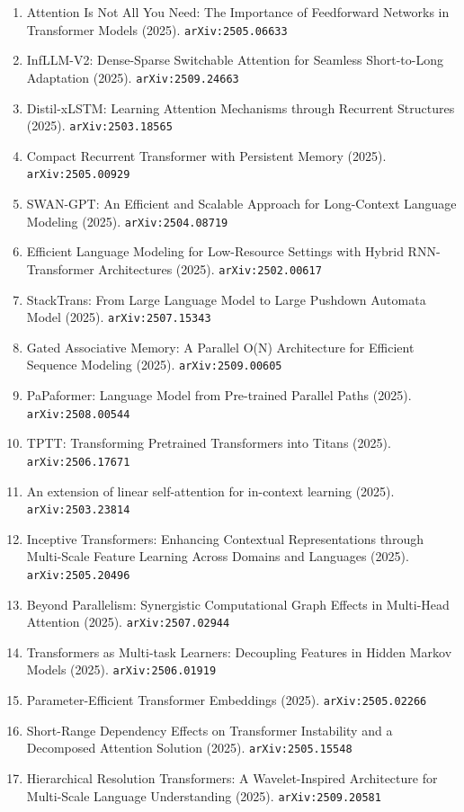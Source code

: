 \documentclass[11pt]{article}
\begin{document}
\begin{enumerate}
  \item Attention Is Not All You Need: The Importance of Feedforward Networks in Transformer Models (2025). \texttt{arXiv:2505.06633}
  \item InfLLM-V2: Dense-Sparse Switchable Attention for Seamless Short-to-Long Adaptation (2025). \texttt{arXiv:2509.24663}
  \item Distil-xLSTM: Learning Attention Mechanisms through Recurrent Structures (2025). \texttt{arXiv:2503.18565}
  \item Compact Recurrent Transformer with Persistent Memory (2025). \texttt{arXiv:2505.00929}
  \item SWAN-GPT: An Efficient and Scalable Approach for Long-Context Language
  Modeling (2025). \texttt{arXiv:2504.08719}
  \item Efficient Language Modeling for Low-Resource Settings with Hybrid
  RNN-Transformer Architectures (2025). \texttt{arXiv:2502.00617}
  \item StackTrans: From Large Language Model to Large Pushdown Automata Model (2025). \texttt{arXiv:2507.15343}
  \item Gated Associative Memory: A Parallel O(N) Architecture for Efficient Sequence Modeling (2025). \texttt{arXiv:2509.00605}
  \item PaPaformer: Language Model from Pre-trained Parallel Paths (2025). \texttt{arXiv:2508.00544}
  \item TPTT: Transforming Pretrained Transformers into Titans (2025). \texttt{arXiv:2506.17671}
  \item An extension of linear self-attention for in-context learning (2025). \texttt{arXiv:2503.23814}
  \item Inceptive Transformers: Enhancing Contextual Representations through Multi-Scale Feature Learning Across Domains and Languages (2025). \texttt{arXiv:2505.20496}
  \item Beyond Parallelism: Synergistic Computational Graph Effects in Multi-Head Attention (2025). \texttt{arXiv:2507.02944}
  \item Transformers as Multi-task Learners: Decoupling Features in Hidden Markov Models (2025). \texttt{arXiv:2506.01919}
  \item Parameter-Efficient Transformer Embeddings (2025). \texttt{arXiv:2505.02266}
  \item Short-Range Dependency Effects on Transformer Instability and a Decomposed Attention Solution (2025). \texttt{arXiv:2505.15548}
  \item Hierarchical Resolution Transformers: A Wavelet-Inspired Architecture for Multi-Scale Language Understanding (2025). \texttt{arXiv:2509.20581}

\end{enumerate}
\end{document}
